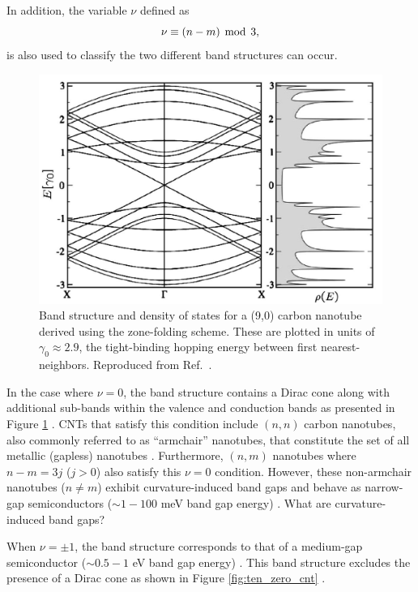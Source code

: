 In addition, the variable $\nu$ defined as
%
\begin{equation}
\label{eq:nu_cnt}
\nu \equiv (n-m) \mathrm{\hspace{1.5mm} mod \hspace{1.5mm}} 3,
\end{equation}
%
is also used to classify the two different band structures can occur.
%
\begin{figure}[h]
	\centering
	\includegraphics[scale=0.36]{images/chapter_optical_props/nine_zero_band_charlier}
	\caption{Band structure and density of states for a (9,0) carbon nanotube derived using the zone-folding scheme. These are plotted in units of $\gamma_0 \approx 2.9$, the tight-binding hopping energy between first nearest-neighbors. Reproduced from Ref.\ \cite{charlier2007electronic}.}
	\label{fig:nine_zero_cnt}
\end{figure}
%
In the case where $\nu = 0 $, the band structure contains a Dirac cone along with additional sub-bands within the valence and conduction bands as presented in Figure \ref{fig:nine_zero_cnt} . CNTs that satisfy this condition include $(n,n)$ carbon nanotubes, also commonly referred to as ``armchair'' nanotubes, that constitute the set of all metallic (gapless) nanotubes \cite{nanot2012optoelectronic}. Furthermore, $(n,m)$ nanotubes where $n-m = 3j$ ($j > 0$) also satisfy this $\nu = 0$ condition. However, these non-armchair nanotubes ($n\neq m$) exhibit curvature-induced band gaps and behave as narrow-gap semiconductors ($\sim1 - 100$ meV band gap energy) \cite{nanot2012optoelectronic}. {\color{red} What are curvature-induced band gaps?}

When $\nu= \pm 1$, the band structure corresponds to that of a medium-gap semiconductor ($\sim0.5 - 1$ eV band gap energy) \cite{nanot2012optoelectronic}. This band structure excludes the presence of a Dirac cone as shown in Figure \ref{fig:ten_zero_cnt}  \cite{charlier2007electronic}.

